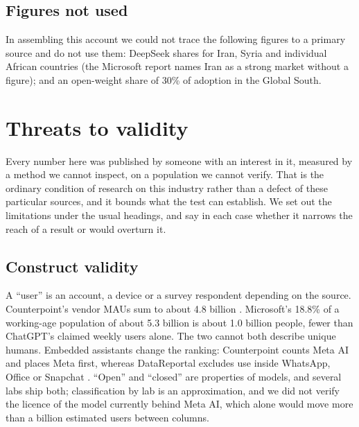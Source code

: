 \documentclass[11pt]{article}
\begin{document}
\subsection{Figures not used} In assembling this account we could not trace the following figures to a primary source and do not use them: DeepSeek shares for Iran, Syria and individual African countries (the Microsoft report names Iran as a strong market without a figure); and an open-weight share of 30\% of adoption in the Global South.

\section{Threats to validity}
\label{sec:validity}

Every number here was published by someone with an interest in it, measured by a method we cannot inspect, on a population we cannot verify. That is the ordinary condition of research on this industry rather than a defect of these particular sources, and it bounds what the test can establish. We set out the limitations under the usual headings, and say in each case whether it narrows the reach of a result or would overturn it.

\subsection{Construct validity} A ``user'' is an account, a device or a survey respondent depending on the source. Counterpoint's vendor MAUs sum to about 4.8 billion \cite{counterpoint2026mau}. Microsoft's 18.8\% of a working-age population of about 5.3 billion \cite{un2024wpp} is about 1.0 billion people, fewer than ChatGPT's claimed weekly users alone. The two cannot both describe unique humans. Embedded assistants change the ranking: Counterpoint counts Meta AI and places Meta first, whereas DataReportal excludes use inside WhatsApp, Office or Snapchat \cite{datareportal2026}. ``Open'' and ``closed'' are properties of models, and several labs ship both; classification by lab is an approximation, and we did not verify the licence of the model currently behind Meta AI, which alone would move more than a billion estimated users between columns.
\end{document}
